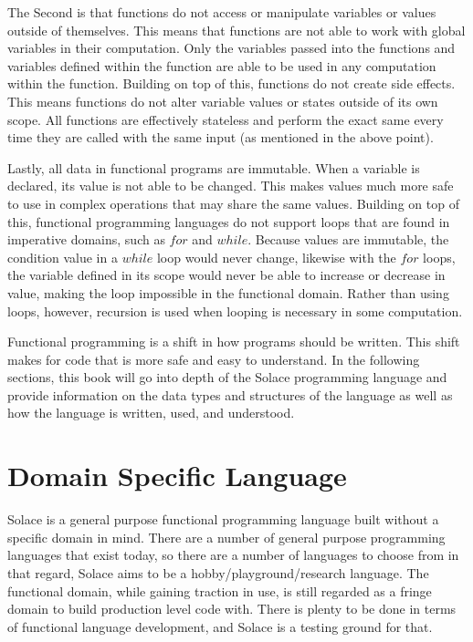 \documentclass{article}
\begin{document}
The Second is that functions do not access or manipulate variables or values outside of themselves. This means
that functions are not able to work with global variables in their computation. Only the variables passed into
the functions and variables defined within the function are able to be used in any computation within the
function. Building on top of this, functions do not create side effects. This means functions do not alter
variable values or states outside of its own scope. All functions are effectively stateless and perform the
exact same every time they are called with the same input (as mentioned in the above point).

Lastly, all data in functional programs are immutable. When a variable is declared, its value is not able to
be changed. This makes values much more safe to use in complex operations that may share the same values. Building
on top of this, functional programming languages do not support loops that are found in imperative domains, such as
$for$ and $while$. Because values are immutable, the condition value in a $while$ loop would never change, likewise with
the $for$ loops, the variable defined in its scope would never be able to increase or decrease in value, making the loop
impossible in the functional domain. Rather than using loops, however, recursion is used when looping is necessary
in some computation.

Functional programming is a shift in how programs should be written. This shift makes for code that is more safe and easy to
understand. In the following sections, this book will go into depth of the Solace programming language and provide
information on the data types and structures of the language as well as how the language is written, used, and understood.


\section{Domain Specific Language}
Solace is a general purpose functional programming language built without a specific domain in mind. There are a number of
general purpose programming languages that exist today, so there are a number of languages to choose from in that regard,
Solace aims to be a hobby/playground/research language. The functional domain, while gaining traction in use, is still
regarded as a fringe domain to build production level code with. There is plenty to be done in terms of functional language
development, and Solace is a testing ground for that.
\end{document}
